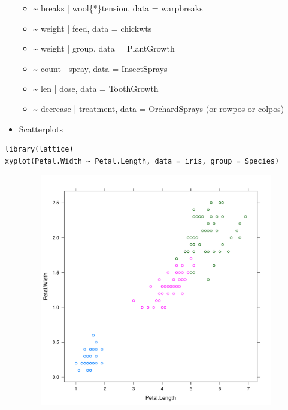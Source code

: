 \documentclass[captions=tableheading]{scrbook}
\begin{document}
\begin{itemize}
\begin{itemize}
\item \~{} breaks | wool\{*\}tension, data = warpbreaks
\item \~{} weight | feed, data = chickwts
\item \~{} weight | group, data = PlantGrowth
\item \~{} count | spray, data = InsectSprays
\item \~{} len | dose, data = ToothGrowth
\item \~{} decrease | treatment, data = OrchardSprays (or rowpos or colpos)
\end{itemize}
\item Scatterplots
\end{itemize}


\begin{verbatim}
library(lattice)
xyplot(Petal.Width ~ Petal.Length, data = iris, group = Species)
\end{verbatim}





\begin{figure}[th]
    \includegraphics[width=5in, height=4in]{img/xyplot-group.pdf}
    \caption{}
    \label{fig:xyplot-group}
  \end{figure}
\end{document}
